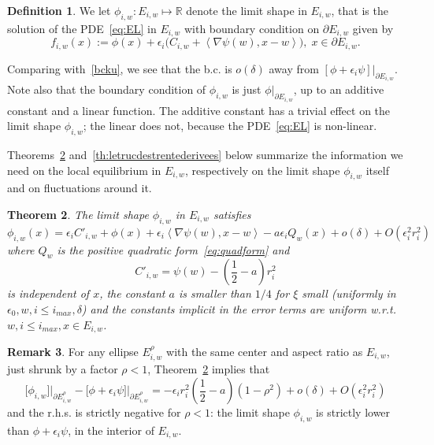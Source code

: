 \documentclass[10pt]{amsart}
\newtheorem{theo}{Theorem}[section]
\theoremstyle{definition}\newtheorem{defi}[theo]{Definition}\newtheorem{rema}[theo]{Remark}\newtheorem{exam}[theo]{Example}\newtheorem{exem}[theo]{Example}\newtheorem{nota}[theo]{Notation}
\newcommand{\R}{\mathbb{R}}
\begin{document}
\begin{defi}\label{def:phiiw}
We let $\phi_{i,w}:E_{i,w}\mapsto \R$ denote the limit shape in $E_{i,w}$, that is the solution of the PDE~\eqref{eq:EL} in $E_{i,w}$ with boundary condition on $\partial E_{i,w}$ given by
\begin{equation}\label{eq:bcku1}
f_{i,w}(x):= \phi(x)+\epsilon_i\Big(C_{i,w}+ \left\langle \nabla\psi(w), x-w\right\rangle\Big),\;x\in \partial E_{i,w}.
\end{equation}
\end{defi}

Comparing with~\eqref{bcku}, we see that the b.c. is $o(\delta)$ away from $[\phi+\epsilon_i\psi]|_{\partial E_{i,w}}$. Note also that the boundary condition of $\phi_{i,w}$ is just $\phi|_{\partial E_{i,w}}$, up to an additive constant and a linear function. The additive constant has a trivial effect on the limit shape $\phi_{i,w}$; the linear does not, because the PDE~\eqref{eq:EL} is non-linear.

Theorems~\ref{thm:equilibrium_development} and~\ref{th:letrucdestrentederivees} below summarize the information we need on the local equilibrium in $E_{i,w}$, respectively on the limit shape $\phi_{i,w}$ itself and on fluctuations around it.




\begin{theo}\label{thm:equilibrium_development}
The limit shape $\phi_{i,w}$ in $E_{i,w}$ satisfies
\begin{equation}\label{eq:sa3}
\phi_{i,w}(x)=\epsilon_i C'_{i,w}+\phi(x)+\epsilon_i \left\langle \nabla\psi(w), x-w\right\rangle-a\epsilon_i Q_w(x) +o(\delta)+O\left(\epsilon_i^2 r_i^2\right)
\end{equation}
where $Q_w$ is the positive quadratic form~\eqref{eq:quadform} and
\begin{equation}\label{eq:C''}
C'_{i,w}=\psi(w)-\left(\frac12-a\right) r_i^2
\end{equation}
is independent of $x$, the constant $a$ is smaller than $1/4$ for $\xi$ small (uniformly in $\epsilon_0,w,i\le i_{max},\delta$) and the constants implicit in the error terms are uniform w.r.t. $w,i\le i_{max}, x\in E_{i,w}$.
\end{theo}


\begin{rema}
For any ellipse $E^\rho_{i,w}$ with the same center and aspect ratio as $E_{i,w}$, just shrunk by a factor $\rho<1$, Theorem~\ref{thm:equilibrium_development} implies that
\begin{equation}\label{eq:psinonpsi}
\big[\phi_{i,w}\big]\big|_{\partial E^\rho_{i,w}}- \big[\phi+\epsilon_i \psi\big]\big|_{\partial E^\rho_{i,w}}=-\epsilon_i r_i^2
\left(\frac12-a\right)\left(1-\rho^2\right)+o(\delta)+O\left(\epsilon_i^2r_i^2\right)
\end{equation}
and the r.h.s. is strictly negative for $\rho<1$: the limit shape $\phi_{i,w}$ is strictly lower than $\phi+\epsilon_i\psi$, in the interior of $E_{i,w}$.
\end{rema}
\end{document}
